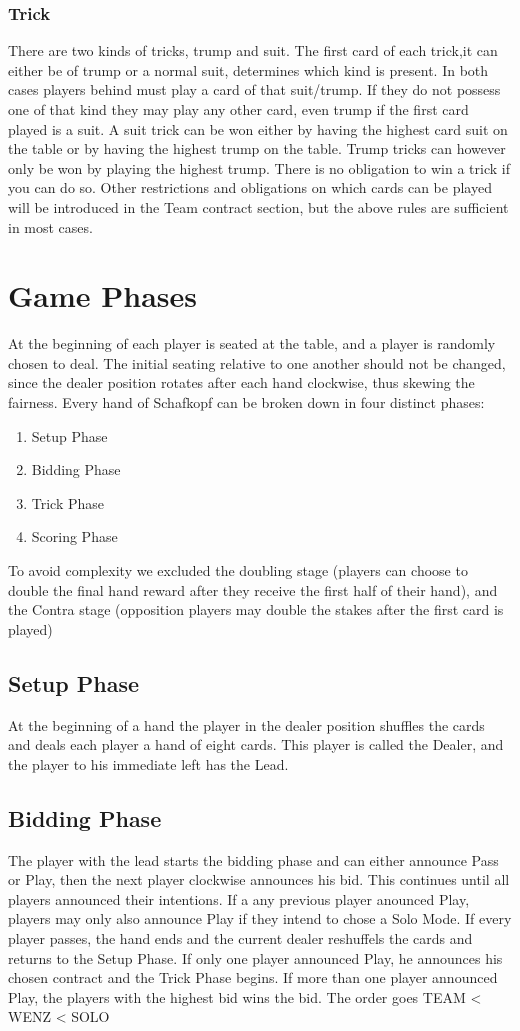 \subsubsection{Trick}
There are two kinds of tricks, trump and suit.
The first card of each trick,it can either be of trump or a normal suit, determines which kind is present.
In both cases players behind must play a card of that suit/trump.
If they do not possess one of that kind they may play any other card, even trump if the first card played is a suit.
\newline
A suit trick can be won either by having the highest card suit on the table or by having the highest trump on the table.
Trump tricks can however only be won by playing the highest trump.
There is no obligation to win a trick if you can do so.
Other restrictions and obligations on which cards can be played will be introduced in the Team contract section,
but the above rules are sufficient in most cases.
\section{Game Phases}
At the beginning of each player is seated at the table, and a player is randomly chosen to deal.
The initial seating relative to one another should not be changed, since the dealer position rotates after each hand
clockwise, thus
skewing the fairness.
\newline
Every hand of Schafkopf can be broken down in four distinct phases:
\begin{enumerate}
    \item Setup Phase
    \item Bidding Phase
    \item Trick Phase
    \item Scoring Phase
\end{enumerate}
To avoid complexity we excluded the doubling stage (players can choose to double the final hand reward after they
receive the first half of their hand), and the Contra stage (opposition players may double the stakes after the first card is played)
\subsection{Setup Phase}
At the beginning of a hand the player in the dealer position shuffles the cards and deals each player a hand of eight
cards.
This player is called the Dealer, and the player to his immediate left has the Lead.
\subsection{Bidding Phase}
The player with the lead starts the bidding phase and can either announce Pass or Play, then the next player clockwise announces his bid.
This continues until all players announced their intentions.
If a any previous player anounced Play, players may only also announce Play if they intend to chose a Solo Mode.
If every player passes, the hand ends and the current dealer reshuffels the cards and returns to
the Setup Phase.
If only one player announced Play, he announces his chosen contract and the Trick Phase begins.
If more than one player announced Play, the players with the highest bid wins the bid.
The order goes TEAM < WENZ < SOLO
